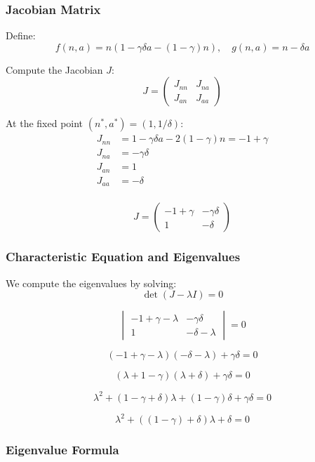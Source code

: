 \documentclass{article}
\begin{document}
\subsubsection*{Jacobian Matrix}

Define:
\[
f(n, a) = n \left( 1 - \gamma \delta a - (1 - \gamma)n \right), \quad 
g(n, a) = n - \delta a
\]

Compute the Jacobian $J$:
\[
J = 
\begin{pmatrix}
J_{nn} & J_{na} \\
J_{an} & J_{aa}
\end{pmatrix}
\]

At the fixed point $(n^*, a^*) = (1, 1/\delta)$:
\begin{align*}
J_{nn} &= 1 - \gamma \delta a - 2(1 - \gamma)n = -1 + \gamma \\
J_{na} &= -\gamma \delta \\
J_{an} &= 1\\
J_{aa}&= -\delta\\
\end{align*}

\[
J =
\begin{pmatrix}
-1 + \gamma & -\gamma \delta \\
1 & -\delta
\end{pmatrix}
\]
\clearpage
\subsubsection*{Characteristic Equation and Eigenvalues}

We compute the eigenvalues by solving:
\[
\det(J - \lambda I) = 0
\]

\[
\begin{vmatrix}
-1 + \gamma - \lambda & -\gamma \delta \\
1 & -\delta - \lambda
\end{vmatrix}
= 0
\]

\[
(-1 + \gamma - \lambda)(-\delta - \lambda) + \gamma \delta = 0
\]

\[
(\lambda + 1 - \gamma)(\lambda + \delta) + \gamma \delta = 0
\]

\[
\lambda^2 + (1 - \gamma + \delta)\lambda + (1 - \gamma)\delta + \gamma \delta = 0
\]

\[
\lambda^2 + \left( (1 - \gamma) + \delta \right)\lambda + \delta = 0
\]

\subsubsection*{Eigenvalue Formula}
\end{document}
